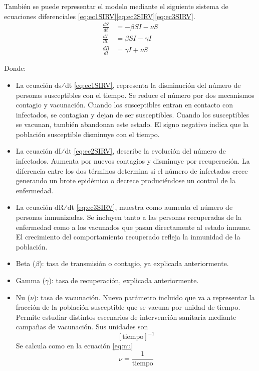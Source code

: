 También se puede representar el modelo mediante el siguiente sistema de ecuaciones diferenciales \eqref{eq:ec1SIRV}\eqref{eq:ec2SIRV}\eqref{eq:ec3SIRV}.
\begin{align}
\frac{dS}{dt} &= -\beta SI - \nu S \label{eq:ec1SIRV} \\
\frac{dI}{dt} &= \beta SI - \gamma I \label{eq:ec2SIRV} \\
\frac{dR}{dt} &= \gamma I + \nu S \label{eq:ec3SIRV}
\end{align}

Donde:
\begin{itemize}
    \item 	La ecuación ds⁄dt \eqref{eq:ec1SIRV}, representa la disminución del número de personas susceptibles con el tiempo. Se reduce el número por dos mecanismos contagio y vacunación. Cuando los susceptibles entran en contacto con infectados, se contagian y dejan de ser susceptibles. Cuando los susceptibles se vacunan, también abandonan este estado. El signo negativo indica que la población susceptible disminuye con el tiempo.
    \item 	La ecuación dI⁄dt \eqref{eq:ec2SIRV}, describe la evolución del número de infectados. Aumenta por nuevos contagios y disminuye por recuperación. La diferencia entre los dos términos determina si el número de infectados crece generando un brote epidémico o decrece produciéndose un control de la enfermedad.
    \item 	La ecuación dR⁄dt \eqref{eq:ec3SIRV}, muestra como aumenta el número de personas inmunizadas. Se incluyen tanto a las personas recuperadas de la enfermedad como a los vacunados que pasan directamente al estado inmune. El crecimiento del comportamiento recuperado refleja la inmunidad de la población.
    \item 	Beta ($\beta$): tasa de transmisión o contagio, ya explicada anteriormente.
    \item 	Gamma ($\gamma$): tasa de recuperación, explicada anteriormente.
    \item	Nu ($\nu$): tasa de vacunación. Nuevo parámetro incluido que va a representar la fracción de la población susceptible que se vacuna por unidad de tiempo. Permite estudiar distintos escenarios de intervención sanitaria mediante campañas de vacunación. Sus unidades son
\[
[\text{tiempo}]^{-1}
\]
Se calcula como en la ecuación \eqref{eq:nu}
\begin{equation}
\nu = \frac{1}{\text{tiempo}}
\label{eq:nu}
\end{equation}

\end{itemize}

